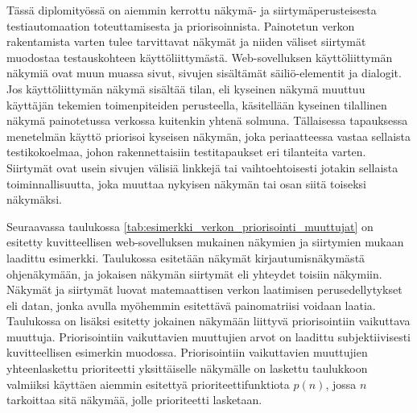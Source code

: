   Tässä diplomityössä on aiemmin kerrottu näkymä- ja siirtymäperusteisesta testiautomaation toteuttamisesta ja priorisoinnista.
  Painotetun verkon rakentamista varten tulee tarvittavat näkymät ja niiden väliset siirtymät muodostaa testauskohteen käyttöliittymästä.
  Web-sovelluksen käyttöliittymän näkymiä ovat muun muassa sivut, sivujen sisältämät säiliö-elementit ja dialogit.
  Jos käyttöliittymän näkymä sisältää tilan, eli kyseinen näkymä muuttuu käyttäjän tekemien toimenpiteiden perusteella, käsitellään kyseinen tilallinen näkymä painotetussa verkossa kuitenkin yhtenä solmuna.
  Tällaisessa tapauksessa menetelmän käyttö priorisoi kyseisen näkymän, joka periaatteessa vastaa sellaista testikokoelmaa, johon rakennettaisiin testitapaukset eri tilanteita varten.
  Siirtymät ovat usein sivujen välisiä linkkejä tai vaihtoehtoisesti jotakin sellaista toiminnallisuutta, joka muuttaa nykyisen näkymän tai osan siitä toiseksi näkymäksi.

  Seuraavassa taulukossa \ref{tab:esimerkki_verkon_priorisointi_muuttujat} on esitetty kuvitteellisen web-sovelluksen mukainen näkymien ja siirtymien mukaan laadittu esimerkki.
  Taulukossa esitetään näkymät kirjautumisnäkymästä ohjenäkymään, ja jokaisen näkymän siirtymät eli yhteydet toisiin näkymiin.
  Näkymät ja siirtymät luovat matemaattisen verkon laatimisen perusedellytykset eli datan, jonka avulla myöhemmin esitettävä painomatriisi voidaan laatia.
  Taulukossa on lisäksi esitetty jokainen näkymään liittyvä priorisointiin vaikuttava muuttuja.
  Priorisointiin vaikuttavien muuttujien arvot on laadittu subjektiivisesti kuvitteellisen esimerkin muodossa.
  Priorisointiin vaikuttavien muuttujien yhteenlaskettu prioriteetti yksittäiselle näkymälle on laskettu taulukkoon valmiiksi käyttäen aiemmin esitettyä prioriteettifunktiota \(p(n)\), jossa \(n\) tarkoittaa sitä näkymää, jolle prioriteetti lasketaan.

